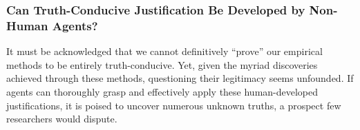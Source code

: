 




\subsubsection{Can Truth-Conducive Justification Be Developed by Non-Human Agents?}


It must be acknowledged that we cannot definitively ``prove'' our empirical methods to be entirely truth-conducive. Yet, given the myriad discoveries achieved through these methods, questioning their legitimacy seems unfounded. If agents can thoroughly grasp and effectively apply these human-developed justifications, it is poised to uncover numerous unknown truths, a prospect few researchers would dispute.

